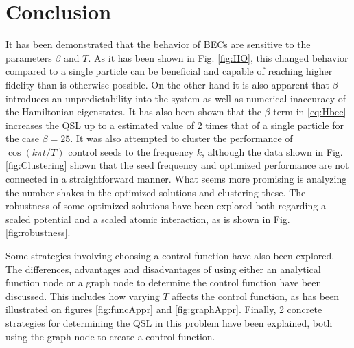 \documentclass[a4paper, twocolumn]{revtex4-1}
\begin{document}


\section{Conclusion}\label{sec:conclusion}
It has been demonstrated that the behavior of BECs are sensitive to the parameters $\beta$ and $T$. As it has been shown in Fig. \ref{fig:HO}, this changed behavior compared to a single particle can be beneficial and capable of reaching higher fidelity than is otherwise possible. On the other hand it is also apparent that $\beta$ introduces an unpredictability into the system as well as numerical inaccuracy of the Hamiltonian eigenstates. It has also been shown that the $\beta$ term in \eqref{eq:Hbec} increases the QSL up to a estimated value of 2 times that of a single particle for the case $\beta=25$. It was also attempted to cluster the performance of $\cos(k\pi t/T)$ control seeds to the frequency $k$, although the data shown in Fig. \ref{fig:Clustering} shown that the seed frequency and optimized performance are not connected in a straightforward manner. What seems more promising is analyzing the number shakes in the optimized solutions and clustering these. The robustness of some optimized solutions have been explored both regarding a scaled potential and a scaled atomic interaction, as is shown in Fig. \ref{fig:robustness}.

Some strategies involving choosing a control function have also been explored. The differences, advantages and disadvantages of using either an analytical function node or a graph node to determine the control function have been discussed. This includes how varying $T$ affects the control function, as has been illustrated on figures \ref{fig:funcAppr} and \ref{fig:graphAppr}. Finally, 2 concrete strategies for determining the QSL in this problem have been explained, both using the graph node to create a control function.
\end{document}
